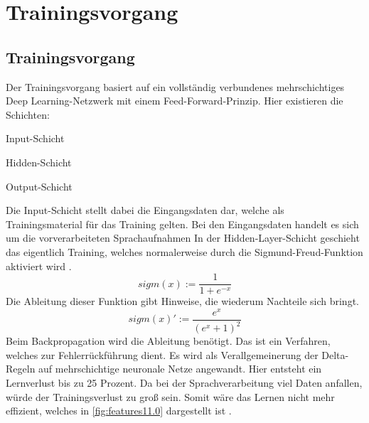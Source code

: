 \section{Trainingsvorgang}

\subsection{Trainingsvorgang}
Der Trainingsvorgang basiert auf ein vollständig verbundenes mehrschichtiges Deep  Learning-Netzwerk mit einem Feed-Forward-Prinzip. Hier existieren die Schichten:
\begin{description}
	\item Input-Schicht
	\item Hidden-Schicht 
	\item Output-Schicht
\end{description}
Die Input-Schicht stellt dabei die Eingangsdaten dar, welche als Trainingsmaterial für das Training gelten. Bei den Eingangsdaten handelt es sich um die vorverarbeiteten Sprachaufnahmen In der Hidden-Layer-Schicht geschieht das eigentlich Training, welches normalerweise durch die Sigmund-Freud-Funktion aktiviert wird \cite{bishop:2006}.
\begin{equation*}
sigm(x) :=\frac{ 1 }{1+e^{-x}  }
\label{normal}
\end{equation*}
Die Ableitung dieser Funktion gibt Hinweise, die wiederum Nachteile sich bringt. 
\begin{equation*}
sigm(x)':= \frac{ e^{x} }{(e^{x} +1)^2  }
\label{ableitung}
\end{equation*}
Beim Backpropagation wird die Ableitung benötigt. Das ist ein Verfahren, welches zur Fehlerrückführung dient. Es wird als Verallgemeinerung der Delta-Regeln auf mehrschichtige neuronale Netze angewandt. Hier entsteht ein Lernverlust bis zu 25 Prozent. Da bei der Sprachverarbeitung viel Daten anfallen, würde der Trainingsverlust zu groß sein. Somit wäre das Lernen nicht mehr effizient, welches in \ref{fig:features11.0} dargestellt ist \cite{Kulbear.2017}.

